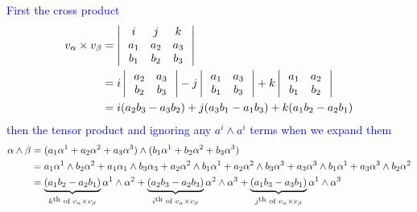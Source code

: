 \documentclass[10pt,a4paper]{report}
\newcommand{\BLUE}[1]{\textcolor{blue}{#1}}
\begin{document}
\begin{enumerate}[label=4.\arabic*]
\BLUE{First the cross product\begin{align*}
	v_\alpha \times v_\beta &= \left |\,  \begin{array}{c c c} i&j&k \\ a_1 & a_2 & a_3 \\ b_1 & b_2 & b_3 \end{array}  \,\right |\\
	&= i\left |\,  \begin{array}{c c} a_2&a_3 \\ b_2 & b_3 \end{array}  \,\right | - j\left |\,  \begin{array}{c c} a_1&a_3 \\ b_1 & b_3 \end{array}  \,\right | + k\left |\,  \begin{array}{c c} a_1&a_2 \\ b_1 & b_2 \end{array}  \,\right | \\
	&=i(a_2b_3-a_3b_2)+j(a_3b_1-a_1b_3)+k(a_1b_2-a_2b_1)
\end{align*}then the tensor product and ignoring any $a^i\wedge a^i$ terms when we expand them
\begin{align*}
	\alpha \wedge \beta &= (a_1\alpha^1 + a_2\alpha^2 + a_3\alpha^3)\wedge(b_1\alpha^1 + b_2\alpha^2 + b_3\alpha^3) \\
	&= a_1\alpha^1\wedge b_2\alpha^2 + a_1\alpha_1\wedge b_3\alpha_3 + a_2\alpha^2\wedge b_1\alpha^1 + a_2\alpha^2\wedge b_3\alpha^3 + a_3\alpha^3\wedge b_1\alpha^1 + a_3\alpha^3\wedge b_2\alpha^2 \\
	&= \underbrace{(a_1b_2-a_2b_1)}_{k\textsuperscript{th} \text{ of }v_\alpha\times v_\beta}\alpha^1\wedge\alpha^2 + \underbrace{(a_2b_3-a_2b_3)}_{i\textsuperscript{th} \text{ of }v_\alpha\times v_\beta}\alpha^2\wedge\alpha^3 + \underbrace{(a_1b_3-a_3b_1)}_{j\textsuperscript{th} \text{ of }v_\alpha\times v_\beta}\alpha^1\wedge\alpha^3
\end{align*}
}

\end{enumerate}
\end{document}
